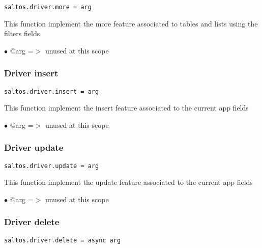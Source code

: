 \documentclass[a4paper]{article}
\begin{document}
\begin{lstlisting}
saltos.driver.more = arg
\end{lstlisting}

This function implement the more feature associated to tables and lists
using the filters fields

\begin{compactitem}
\item[\color{myblue}$\bullet$] @arg =$>$ unused at this scope
\end{compactitem}

\hypertarget{toc732}{}
\subsubsection{Driver insert}

\begin{lstlisting}
saltos.driver.insert = arg
\end{lstlisting}

This function implement the insert feature associated to the current app fields

\begin{compactitem}
\item[\color{myblue}$\bullet$] @arg =$>$ unused at this scope
\end{compactitem}

\hypertarget{toc733}{}
\subsubsection{Driver update}

\begin{lstlisting}
saltos.driver.update = arg
\end{lstlisting}

This function implement the update feature associated to the current app fields

\begin{compactitem}
\item[\color{myblue}$\bullet$] @arg =$>$ unused at this scope
\end{compactitem}

\hypertarget{toc734}{}
\subsubsection{Driver delete}

\begin{lstlisting}
saltos.driver.delete = async arg
\end{lstlisting}
\end{document}
